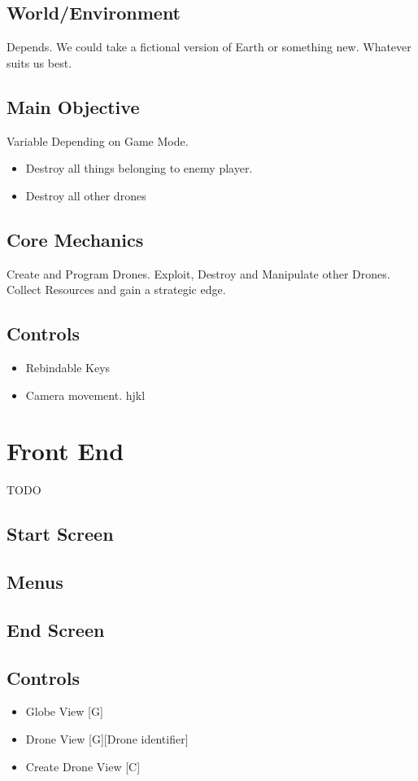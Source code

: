\documentclass[a4paper]{scrreprt}
\begin{document}
\section{World/Environment}
Depends. We could take a fictional version of Earth or something new. Whatever suits us best.

\section{Main Objective}
Variable Depending on Game Mode.
\begin{itemize}
    \item Destroy all things belonging to enemy player.
    \item Destroy all other drones 
\end{itemize}


\section{Core Mechanics}
Create and Program Drones. Exploit, Destroy and Manipulate other Drones. Collect Resources and gain a strategic edge.

\section{Controls}
\begin{itemize}
    \item Rebindable Keys
    \item Camera movement. hjkl
\end{itemize}


\chapter{Front End}
TODO

\section{Start Screen}

\section{Menus}

\section{End Screen}
\section{Controls}
\begin{itemize}
    \item Globe View [G]
    \item Drone View [G][Drone identifier]
    \item Create Drone View [C]
\end{itemize}
\end{document}
